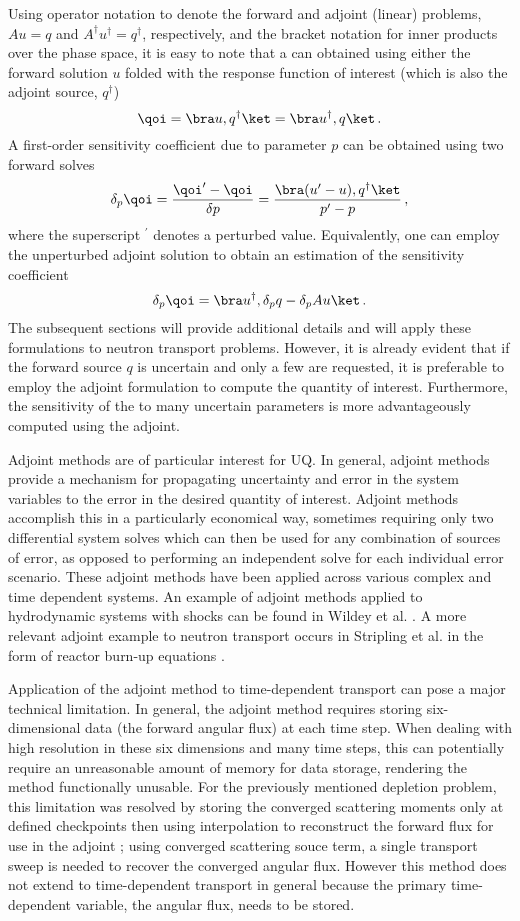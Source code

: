 Using operator notation to denote the forward and adjoint (linear) problems, $Au=q$ and $A^\dag u^\dag = q^\dag$, respectively, and the bracket notation for inner products over the phase space, it is easy to note that a \qoi can 
obtained using either the forward solution $u$ folded with the response function of interest (which is also the adjoint source, $q^\dag$)
\[
\qoi = \bra u, q^\dag \ket = \bra u^\dag, q \ket \,.
\]
A first-order sensitivity coefficient due to parameter $p$ can be obtained using two forward solves
\[
\delta_p \qoi = \frac{\qoi^\prime - \qoi}{\delta p} = \frac{ \bra (u^\prime - u), q^\dag \ket}{p^\prime - p}  \,,
\]
where the superscript $^\prime$ denotes a perturbed value. Equivalently, one can employ the unperturbed adjoint solution to obtain
an estimation of the sensitivity coefficient
\[
\delta_p \qoi = \bra u^\dag, \delta_p q - \delta_p A u \ket \,.
\]
The subsequent sections will provide additional details and will apply these formulations to neutron transport problems. However, it is already evident that if the forward source $q$ is uncertain and only a few \qoi are requested, it is preferable to employ the adjoint formulation to compute the quantity of interest. Furthermore, the sensitivity of the
\qoi to many uncertain parameters is more advantageously computed using the adjoint.


Adjoint methods are of particular interest for UQ. In general, adjoint methods provide a mechanism for propagating uncertainty and error in the system variables to the error in the desired quantity of interest. Adjoint methods accomplish this in a particularly economical way, sometimes requiring only two differential system solves which can then be used for any combination of sources of error, as opposed to performing an independent solve for each individual error scenario. These adjoint methods have been applied across various complex and time dependent systems. An example of adjoint methods applied to hydrodynamic systems with shocks can be found in Wildey et al. \cite{Wildey}. A more relevant adjoint example to neutron transport occurs in Stripling et al. in the form of reactor burn-up equations \cite{Stripling}.


Application of the adjoint method to time-dependent transport can pose a major technical limitation. In general, the adjoint method requires storing six-dimensional data (the forward angular flux) at each time step. When dealing with high resolution in these six dimensions and many time steps, this can potentially require an unreasonable amount of memory for data storage, rendering the method functionally unusable. For the previously mentioned depletion problem, this limitation was resolved by storing the converged scattering moments only at defined checkpoints then using interpolation to reconstruct the forward flux for use in the adjoint \cite{Stripling};
using converged scattering souce term, a single transport sweep is needed to recover the converged
angular flux. However this method does not extend to time-dependent transport in general because
the primary time-dependent variable, the angular flux, needs to be stored. 

